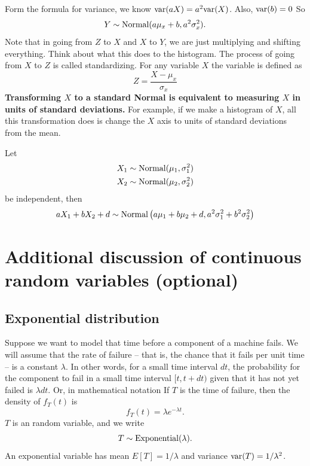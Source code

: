 Form the formula for variance, we know ${\rm var}(aX)  = a^2{\rm var}(X)$. Also, ${\rm var}(b) =0$
So 
\begin{equation*}\label{eq:normal_linear_trans}
Y \sim {\rm Normal}(a\mu_x + b,a^2\sigma_x^2).
\end{equation*}
Note that in going from $Z$ to $X$ and $X$ to $Y$, we are just multiplying and shifting everything.
Think about what this does to the histogram. 
 The process of going from $X$ to $Z$ is called standardizing. For any variable $X$ the  variable is defined as 
\begin{equation*}
Z = \frac{X-\mu_x}{\sigma_x}
\end{equation*}
 {\bf Transforming $X$ to a standard Normal is equivalent to measuring $X$ in units of standard deviations.} For example, if we make a histogram of $X$, all this transformation does is change the $X$ axis to units of standard deviations from the mean. 

  \begin{thm}\label{thm:addingnormal}
Let
\begin{align*}
X_1 &\sim {\rm Normal}(\mu_1,\sigma_1^2)\\
X_2 &\sim {\rm Normal}(\mu_2,\sigma_2^2)
\end{align*}
be independent, then 
\begin{equation*}
aX_1+bX_2 + d \sim {\rm Normal}\left(a\mu_1+b\mu_2+d,a^2\sigma_1^2 + b^2\sigma_2^2\right)
\end{equation*}
 \end{thm}



\appendix

 \section{Additional discussion of continuous random variables (optional)}


\subsection{Exponential distribution}
 Suppose we want to model that time before a component of a machine fails. We will assume that the rate of failure -- that is, the chance that it fails per unit time -- is a constant $\lambda$. In other words, for a small time interval $dt$, the probability for the component to fail in a small time interval $[t,t+dt)$ given that it has not yet failed is $\lambda dt$. Or, in mathematical notation 
 If $T$ is the time of failure, then the density of $f_T(t)$ is 
\begin{equation*}
f_T(t) = \lambda e^{-\lambda t}.
\end{equation*}
$T$ is an  random variable, and we write
\begin{equation*}
T \sim {\rm Exponential}(\lambda).
\end{equation*}
An exponential variable has mean $E[T] = 1/\lambda$ and variance ${\rm var}(T) = 1/\lambda^2$. 



